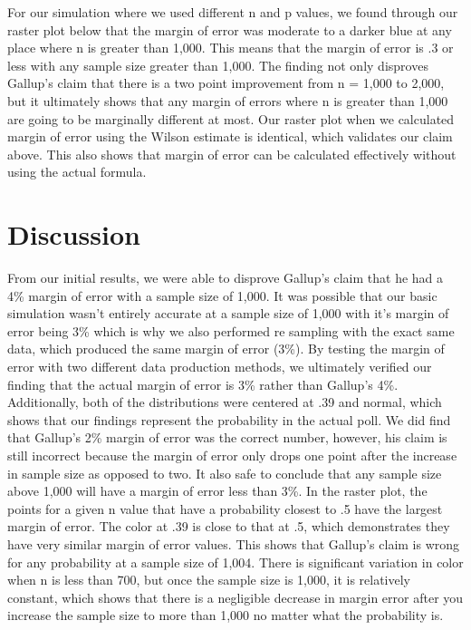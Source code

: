 \documentclass{article}\usepackage[]{graphicx}\usepackage[]{xcolor}
\begin{document}
\begin{multicols}{2}
For our simulation where we used different n and p values, we found through our raster plot below that the margin of error was moderate to a darker blue at any place where n is greater than 1,000. This means that the margin of error is .3 or less with any sample size greater than 1,000. The finding not only disproves Gallup's claim that there is a two point improvement from n = 1,000 to 2,000, but it ultimately shows that any margin of errors where n is greater than 1,000 are going to be marginally different at most. Our raster plot when we calculated margin of error using the Wilson estimate is identical, which validates our claim above. This also shows that margin of error can be calculated effectively without using the actual formula. 




\section{Discussion}

  From our initial results, we were able to disprove Gallup's claim that he had a 4\% margin of error with a sample size of 1,000. It was possible that our basic simulation wasn't entirely accurate at a sample size of 1,000 with it's margin of error being 3\% which is why we also performed re sampling with the exact same data, which produced the same margin of error (3\%). By testing the margin of error with two different data production methods, we ultimately verified our finding that the actual margin of error is 3\% rather than Gallup's 4\%. Additionally, both of the distributions were centered at .39 and normal, which shows that our findings represent the probability in the actual poll. We did find that Gallup's 2\% margin of error was the correct number, however, his claim is still incorrect because the margin of error only drops one point after the increase in sample size as opposed to two. 
  It also safe to conclude that any sample size above 1,000 will have a margin of error less than 3\%. In the raster plot, the points for a given n value that have a probability closest to .5 have the largest margin of error. The color at .39 is close to that at .5, which demonstrates they have very similar margin of error values. This shows that Gallup's claim is wrong for any probability at a sample size of 1,004. There is significant variation in color when n is less than 700, but once the sample size is 1,000, it is relatively constant, which shows that there is a negligible decrease in margin error after you increase the sample size to more than 1,000 no matter what the probability is. 


\vspace{2em}


\begin{tiny}

\end{tiny}
\end{multicols}
\end{document}
